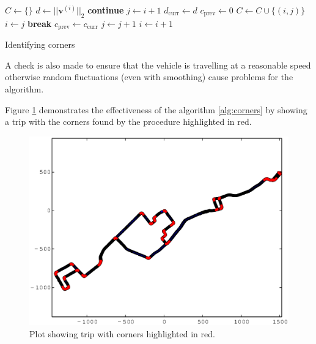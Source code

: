 \documentclass[a4paper, 11pt, twocolumn]{report}
\begin{document}
\begin{algorithm}
\begin{algorithmic}
    \State $C \gets \{\}$
        \State $d \gets ||\mathbf{v}^{(i)}||_2$
            \State \textbf{continue}
        \EndIf
        \State $j \gets i + 1$
        \State $d_{\text{curr}} \gets d$    
        \State $c_{\text{prev}} \gets 0$ 
        \Loop
                    \State $C \gets C \cup \{(i, j)\}$
                    \State $i \gets j$
                \EndIf
                \State \textbf{break}
            \EndIf
            \State $c_{\text{prev}} \gets c_{\text{curr}}$ 
            \State $j \gets j+1$
        \EndLoop
        \State $i \gets i+1$
    \EndWhile
\end{algorithmic}
\caption{Identifying corners}
\label{alg:corners}
\end{algorithm}

A check is also made to ensure that the vehicle is travelling at a reasonable speed otherwise random fluctuations (even with smoothing) cause problems for the algorithm.

Figure \ref{fig:corners} demonstrates the effectiveness of the algorithm \ref{alg:corners} by showing a trip with the corners found by the procedure highlighted in red. 

\begin{figure}[h]
    \center
    \includegraphics[width=\linewidth]{img/corners}
    \caption{Plot showing trip with corners highlighted in red.}
    \label{fig:corners}
\end{figure}
\end{document}

